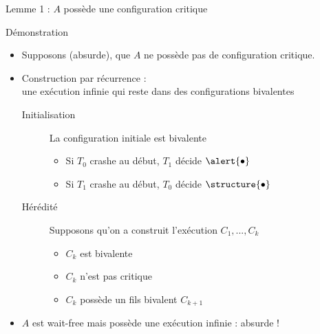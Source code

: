 
\begingroup

\begin{frame}[fragile]{Lemme 1 : $A$ possède une configuration critique}

  \begin{exampleblock}{Démonstration}
    \begin{itemize}
    \item Supposons (absurde), que $A$ ne possède pas de configuration critique.
    \item Construction par récurrence :\\
      une exécution {\color{exampleColor}infinie} qui reste dans des {\color{exampleColor}configurations bivalentes}
      \begin{description}
      \item[Initialisation] La configuration initiale est bivalente
        \begin{itemize}
        \item Si $T_0$ crashe au début, $T_1$ décide $\alert{\bullet}$
        \item Si $T_1$ crashe au début, $T_0$ décide $\structure{\bullet}$
        \end{itemize}
      \item[Hérédité] Supposons qu'on a construit l'exécution $C_1, ..., C_k$
        \begin{itemize}
        \item $C_k$ est bivalente
        \item $C_k$ n'est pas critique
        \item $C_k$ possède un fils bivalent $C_{k+1}$ 
        \end{itemize}
      \end{description}
    \item $A$ est wait-free mais possède une exécution infinie : {\color{exampleColor}absurde !}
    \end{itemize}
  \end{exampleblock}

\end{frame}

\endgroup
\endinput
